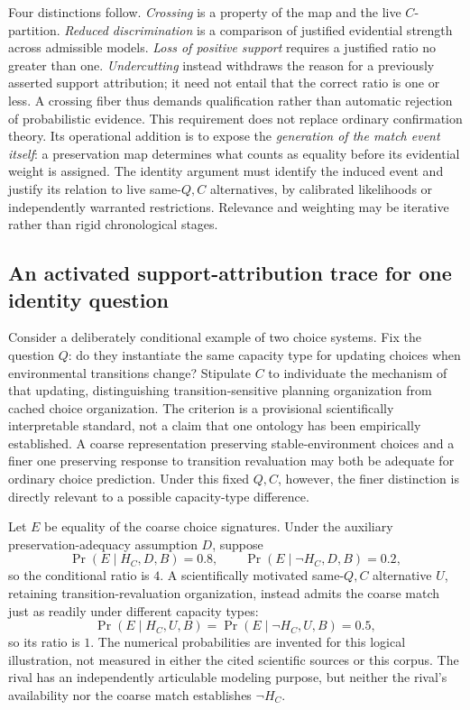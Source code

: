 \documentclass[11pt]{article}
\begin{document}
Four distinctions follow. \emph{Crossing} is a property of the map and the live \(C\)-partition. \emph{Reduced discrimination} is a comparison of justified evidential strength across admissible models. \emph{Loss of positive support} requires a justified ratio no greater than one. \emph{Undercutting} instead withdraws the reason for a previously asserted support attribution; it need not entail that the correct ratio is one or less. A crossing fiber thus demands qualification rather than automatic rejection of probabilistic evidence. This requirement does not replace ordinary confirmation theory. Its operational addition is to expose the \emph{generation of the match event itself}: a preservation map determines what counts as equality before its evidential weight is assigned. The identity argument must identify the induced event and justify its relation to live same-\(Q,C\) alternatives, by calibrated likelihoods or independently warranted restrictions. Relevance and weighting may be iterative rather than rigid chronological stages.

\subsection{An activated support-attribution trace for one identity question}
\label{sec:m28-same-question}

Consider a deliberately conditional example of two choice systems. Fix the question \(Q\): do they instantiate the same capacity type for updating choices when environmental transitions change? Stipulate \(C\) to individuate the mechanism of that updating, distinguishing transition-sensitive planning organization from cached choice organization. The criterion is a provisional scientifically interpretable standard, not a claim that one ontology has been empirically established. A coarse representation preserving stable-environment choices and a finer one preserving response to transition revaluation may both be adequate for ordinary choice prediction. Under this fixed \(Q,C\), however, the finer distinction is directly relevant to a possible capacity-type difference.

Let \(E\) be equality of the coarse choice signatures. Under the auxiliary preservation-adequacy assumption \(D\), suppose
\[
\Pr(E\mid H_C,D,B)=0.8,\qquad
\Pr(E\mid\neg H_C,D,B)=0.2,
\]
so the conditional ratio is \(4\). A scientifically motivated same-\(Q,C\) alternative \(U\), retaining transition-revaluation organization, instead admits the coarse match just as readily under different capacity types:
\[
\Pr(E\mid H_C,U,B)=
\Pr(E\mid\neg H_C,U,B)=0.5,
\]
so its ratio is \(1\). The numerical probabilities are invented for this logical illustration, not measured in either the cited scientific sources or this corpus. The rival has an independently articulable modeling purpose, but neither the rival's availability nor the coarse match establishes \(\neg H_C\).
\end{document}
